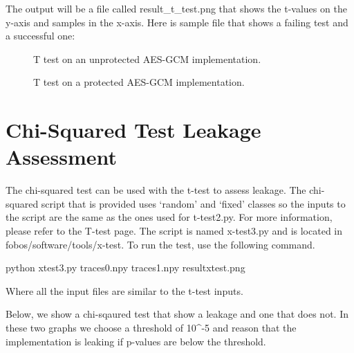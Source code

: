 \documentclass[letterpaper,10pt,english]{sphinxmanual}
\begin{document}
\begin{sphinxVerbatim}[commandchars=\\\{\}]
    
\end{sphinxVerbatim}

The output will be a file called result\_t\_test.png that shows the t-values on the y-axis and samples in the x-axis.
Here is sample file that shows a failing test and a successful one:

\begin{figure}[htbp]
\centering
\capstart

\noindent{}
\caption{T test on an unprotected AES-GCM implementation.}\label{\detokenize{t_test:id2}}\end{figure}

\begin{figure}[htbp]
\centering
\capstart

\noindent{}
\caption{T test on a protected AES-GCM implementation.}\label{\detokenize{t_test:id3}}\end{figure}


\chapter{Chi-Squared Test Leakage Assessment}
\label{\detokenize{x_test:chi-squared-test-leakage-assessment}}\label{\detokenize{x_test::doc}}
The chi-squared test can be used with the t-test to assess leakage.
The chi-squared script that is provided uses ‘random’ and ‘fixed’ classes so the inputs
to the script are the same as the ones used for t-test2.py. For more information, please refer
to the T-test page.
The script is named x-test3.py and is located in fobos/software/tools/x-test.
To run the test, use the following command.

\begin{sphinxVerbatim}[commandchars=\\\{\}]
python x\PYGZhy{}test3.py traces0.npy traces1.npy result\PYGZus{}x\PYGZus{}test.png
\end{sphinxVerbatim}

Where all the input files are similar to the t-test inputs.

Below, we show a chi-sqaured test that show a leakage and one that does not. In these two graphs we
choose a threshold of 10\textasciicircum{}-5 and reason that the implementation is leaking if p-values are below the threshold.
\end{document}
